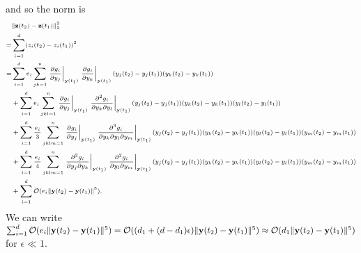 %
and so the norm is
%
\begin{equation} \label{eq:appendix_z_norm}
\scriptsize
\begin{aligned}
& \|\mathbf{z}(t_2) - \mathbf{z}(t_1)\|_2^2 \\ =& 
\sum_{i=1}^d (z_i(t_2) - z_i(t_1))^2 \\
=& \sum_{i=1}^d e_i \sum_{jk=1}^n \left. \frac{\partial g_i}{\partial y_j} \right|_{\mathbf{y}(t_1)} \left. \frac{\partial g_i}{\partial y_k} \right|_{\mathbf{y}(t_1)} (y_j(t_2)-y_j(t_1)) (y_k(t_2)-y_k(t_1)) \\
&+ \sum_{i=1}^d e_i \sum_{jkl=1}^n \left. \frac{\partial g_i}{\partial y_j} \right|_{\mathbf{y}(t_1)} \left. \frac{\partial^2 g_i}{\partial y_k \partial y_l} \right|_{\mathbf{y}(t_1)} (y_j(t_2)-y_j(t_1))  (y_k(t_2)-y_k(t_1)) (y_l(t_2)-y_l(t_1)) \\
&+ \sum_{i=1}^d \frac{e_i}{3} \sum_{jklm=1}^n \left. \frac{\partial g_i}{\partial y_j} \right|_{\mathbf{y}(t_1)} \left. \frac{\partial^3 g_i}{ \partial y_k \partial y_l \partial y_m} \right|_{\mathbf{y}(t_1)} (y_j(t_2)-y_j(t_1)) (y_k(t_2)-y_k(t_1)) (y_l(t_2)-y_l(t_1))(y_m(t_2)-y_m(t_1)) \\
&+ \sum_{i=1}^d \frac{e_i}{4} \sum_{jklm=1}^n \left. \frac{\partial^2 g_i}{\partial y_j \partial y_k} \right|_{\mathbf{y}(t_1)} \left. \frac{\partial^2 g_i}{\partial y_l \partial y_m} \right|_{\mathbf{y}(t_1)} (y_j(t_2)-y_j(t_1)) (y_k(t_2)-y_k(t_1)) (y_l(t_2)-y_l(t_1)) (y_m(t_2)-y_m(t_1)) \\
&+ \sum_{i=1}^d \mathcal{O}( e_i \|\mathbf{y}(t_2) - \mathbf{y}(t_1) \|^5) .
\end{aligned}
\end{equation}
%
We can write $\sum_{i=1}^d \mathcal{O}( e_i \|\mathbf{y}(t_2) - \mathbf{y}(t_1) \|^5) = \mathcal{O}( ({d_1} + (d-{d_1}) \epsilon) \|\mathbf{y}(t_2) - \mathbf{y}(t_1) \|^5) \approx \mathcal{O}( {d_1} \|\mathbf{y}(t_2) - \mathbf{y}(t_1) \|^5)$ for $\epsilon \ll 1$. 

